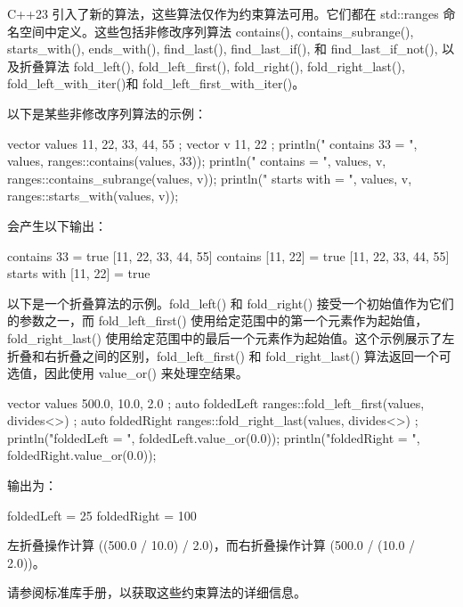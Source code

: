 

C++23 引入了新的算法，这些算法仅作为约束算法可用。它们都在 std::ranges 命名空间中定义。这些包括非修改序列算法 contains(), contains\_subrange(), starts\_with(), ends\_with(), find\_last(), find\_last\_if(), 和 find\_last\_if\_not(), 以及折叠算法 fold\_left(), fold\_left\_first(), fold\_right(), fold\_right\_last(), fold\_left\_with\_iter()和 fold\_left\_first\_with\_iter()。

以下是某些非修改序列算法的示例：

\begin{cpp}
vector values { 11, 22, 33, 44, 55 };
vector v { 11, 22 };
println("{} contains 33 = {}", values, ranges::contains(values, 33));
println("{} contains {} = {}", values, v, ranges::contains_subrange(values, v));
println("{} starts with {} = {}", values, v, ranges::starts_with(values, v));
\end{cpp}

会产生以下输出：

\begin{shell}
[11, 22, 33, 44, 55] contains 33 = true
[11, 22, 33, 44, 55] contains [11, 22] = true
[11, 22, 33, 44, 55] starts with [11, 22] = true
\end{shell}

以下是一个折叠算法的示例。fold\_left() 和 fold\_right() 接受一个初始值作为它们的参数之一，而 fold\_left\_first() 使用给定范围中的第一个元素作为起始值，fold\_right\_last() 使用给定范围中的最后一个元素作为起始值。这个示例展示了左折叠和右折叠之间的区别，fold\_left\_first() 和 fold\_right\_last() 算法返回一个可选值，因此使用 value\_or() 来处理空结果。

\begin{cpp}
vector values { 500.0, 10.0, 2.0 };
auto foldedLeft { ranges::fold_left_first(values, divides<>{}) };
auto foldedRight { ranges::fold_right_last(values, divides<>{}) };
println("foldedLeft = {}", foldedLeft.value_or(0.0));
println("foldedRight = {}", foldedRight.value_or(0.0));
\end{cpp}

输出为：

\begin{shell}
foldedLeft = 25
foldedRight = 100
\end{shell}

左折叠操作计算 ((500.0 / 10.0) / 2.0)，而右折叠操作计算 (500.0 / (10.0 / 2.0))。

请参阅标准库手册，以获取这些约束算法的详细信息。











